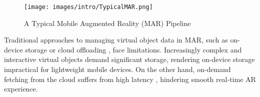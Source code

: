 
    \begin{figure}[t]
        \centering
        \texttt{[image: images/intro/TypicalMAR.png]}
        \caption{A Typical Mobile Augmented Reality (MAR) Pipeline}
        \label{fig:marpipeline}
        \vspace{-7mm}
    \end{figure}
    
    Traditional approaches to managing virtual object data in MAR, such as on-device storage \cite{bib:ondevice} or cloud offloading \cite{bib:overlay}, face limitations.  Increasingly complex and interactive virtual objects demand significant storage, rendering on-device storage impractical for lightweight mobile devices.  On the other hand, on-demand fetching from the cloud suffers from high latency \cite{bib:clt1, bib:clt2}, hindering smooth real-time AR experience.
    
